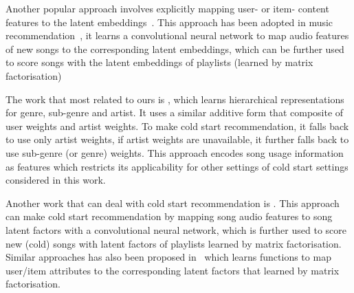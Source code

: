 Another popular approach involves explicitly mapping user- or item- content features to the latent embeddings~\cite{Gantner:2010}.
This approach has been adopted in music recommendation~\cite{van2013deep},
it learns a convolutional neural network to map audio features of new songs to the corresponding latent embeddings,
which can be further used to score songs with the latent embeddings of playlists (learned by matrix factorisation)



The work that most related to ours is \citep{ben2017groove}, which learns hierarchical representations
for genre, sub-genre and artist.
It uses a similar additive form that composite of user weights and artist weights.
To make cold start recommendation, it falls back to use only artist weights,
if artist weights are unavailable, it further falls back to use sub-genre (or genre) weights.
This approach encodes song usage information as features which restricts its applicability for other settings
of cold start settings considered in this work.

Another work that can deal with cold start recommendation is \citep{van2013deep}.
This approach can make cold start recommendation by mapping song audio features to song latent factors 
with a convolutional neural network, which is further used to score new (cold) songs with 
latent factors of playlists learned by matrix factorisation.
Similar approaches has also been proposed in~\cite{Gantner:2010} which learns functions to map
user/item attributes to the corresponding latent factors that learned by matrix factorisation.




